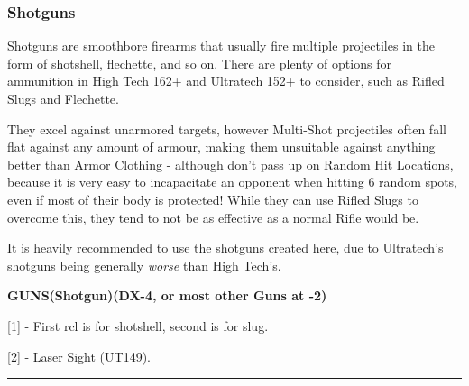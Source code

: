 \subsubsection{Shotguns}

Shotguns are smoothbore firearms that usually fire multiple projectiles in the form of shotshell, flechette, and so on. There are plenty of options for ammunition in High Tech 162+ and Ultratech 152+ to consider, such as Rifled Slugs and Flechette. 

They excel against unarmored targets, however Multi-Shot projectiles often fall flat against any amount of armour, making them unsuitable against anything better than Armor Clothing - although don't pass up on Random Hit Locations, because it is very easy to incapacitate an opponent when hitting 6 random spots, even if most of their body is protected! While they can use Rifled Slugs to overcome this, they tend to not be as effective as a normal Rifle would be.

It is heavily recommended to use the shotguns created here, due to Ultratech's shotguns being generally \textit{worse} than High Tech's.

\textbf{GUNS(Shotgun)(DX-4, or most other Guns at -2)}
\begin{center} 
	\begin{adjustwidth}{-8mm}{}
	\end{adjustwidth}
\end{center}

[1] - First rcl is for shotshell, second is for slug.

[2] - Laser Sight (UT149).

\par\rule{\textwidth}{0.5pt} 

